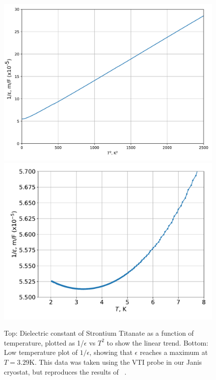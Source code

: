 \documentclass{thesis-umich}
\begin{document}
\begin{figure}
	\caption[Dielectric constant of Strontium Titanate]{Top: Dielectric constant of Strontium Titanate as a function
		of temperature, plotted as 1/$\epsilon$ vs $T^2$ to show the
		linear trend. Bottom: Low temperature plot of $1/\epsilon$,
		showing that $\epsilon$ reaches a maximum at $T = 3.29$K. This
		data was taken using the VTI probe in our Janis cryostat, but
		reproduces the results of ~\cite{Rowley2014}.}
		\label{fig:sto_eps_vs_T}
		\includegraphics[width=0.9\columnwidth]{figures/STO_eps_vs_T.pdf}
		\includegraphics[width=0.9\columnwidth]{figures/STO_eps_vs_T_low.pdf}
 \end{figure}
\end{document}
